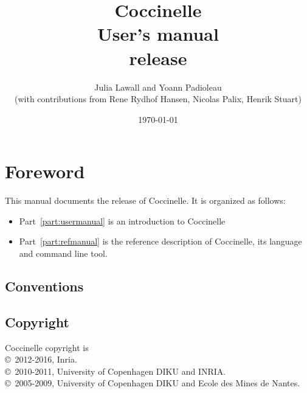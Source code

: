 \documentclass[UTF8]{ctexrep}
\begin{document}
\date{}

\title{
{\Huge \bf Coccinelle}\\
{User's manual}\\
{release \cocciversion}\\
}

\author{
Julia Lawall and Yoann Padioleau \\
{(with contributions from
Rene Rydhof Hansen,
Nicolas Palix,
Henrik Stuart)
}
}

\date{\today}

\maketitle
\tableofcontents


\chapter*{Foreword}

This manual documents the release \cocciversion{} of Coccinelle.
It is organized as follows:
\begin{itemize}
  \item Part~\ref{part:usermanual} is an introduction to Coccinelle
  \item Part~\ref{part:refmanual} is the reference description
    of Coccinelle, its language and command line tool.
\end{itemize}

\section*{Conventions}

\section*{Copyright}

Coccinelle copyright is\\
\copyright~2012-2016, Inria.\\
\copyright~2010-2011, University of Copenhagen DIKU and INRIA.\\
\copyright~2005-2009, University of Copenhagen DIKU and Ecole des Mines de Nantes.
\end{document}
